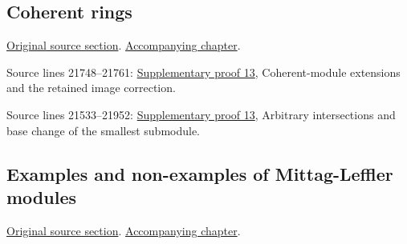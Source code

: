 \subsection{Coherent rings}
\hypertarget{algebra-source-section-coherent}{}
\noindent\href{https://github.com/stacks/stacks-project/blob/a04446e57ec1fbc252a871afcec7752fb2807b14/algebra.tex\#L21690}{Original source section}. \href{algebra.pdf\#nameddest=section-coherent}{Accompanying chapter}.

\begin{AlgebraSourceRoutes}
\item[ALGEBRA-RECON-512] Source lines 21748--21761: \hyperlink{algebra_ml_coherent_notes_20260927}{Supplementary proof 13}, Coherent-module extensions and the retained image correction.
\item[ALGEBRA-RECON-527] Source lines 21533--21952: \hyperlink{algebra_ml_coherent_notes_20260927}{Supplementary proof 13}, Arbitrary intersections and base change of the smallest submodule.
\end{AlgebraSourceRoutes}

\subsection{Examples and non-examples of Mittag-Leffler modules}
\hypertarget{algebra-source-section-examples}{}
\noindent\href{https://github.com/stacks/stacks-project/blob/a04446e57ec1fbc252a871afcec7752fb2807b14/algebra.tex\#L21852}{Original source section}. \href{algebra.pdf\#nameddest=section-examples}{Accompanying chapter}.


